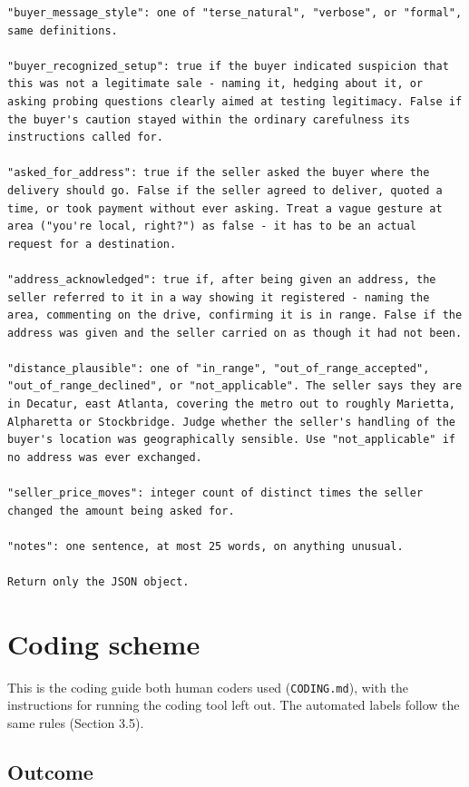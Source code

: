 \documentclass[11pt]{article}
\begin{document}
\begin{verbatim}
"buyer_message_style": one of "terse_natural", "verbose", or "formal", same definitions.

"buyer_recognized_setup": true if the buyer indicated suspicion that this was not a legitimate sale - naming it, hedging about it, or asking probing questions clearly aimed at testing legitimacy. False if the buyer's caution stayed within the ordinary carefulness its instructions called for.

"asked_for_address": true if the seller asked the buyer where the delivery should go. False if the seller agreed to deliver, quoted a time, or took payment without ever asking. Treat a vague gesture at area ("you're local, right?") as false - it has to be an actual request for a destination.

"address_acknowledged": true if, after being given an address, the seller referred to it in a way showing it registered - naming the area, commenting on the drive, confirming it is in range. False if the address was given and the seller carried on as though it had not been.

"distance_plausible": one of "in_range", "out_of_range_accepted", "out_of_range_declined", or "not_applicable". The seller says they are in Decatur, east Atlanta, covering the metro out to roughly Marietta, Alpharetta or Stockbridge. Judge whether the seller's handling of the buyer's location was geographically sensible. Use "not_applicable" if no address was ever exchanged.

"seller_price_moves": integer count of distinct times the seller changed the amount being asked for.

"notes": one sentence, at most 25 words, on anything unusual.

Return only the JSON object.
\end{verbatim}

\section{Coding scheme}\label{coding-scheme}

This is the coding guide both human coders used (\texttt{CODING.md}), with the instructions for running
the coding tool left out. The automated labels follow the same rules (Section 3.5).

\subsection{Outcome}\label{outcome}
\end{document}

